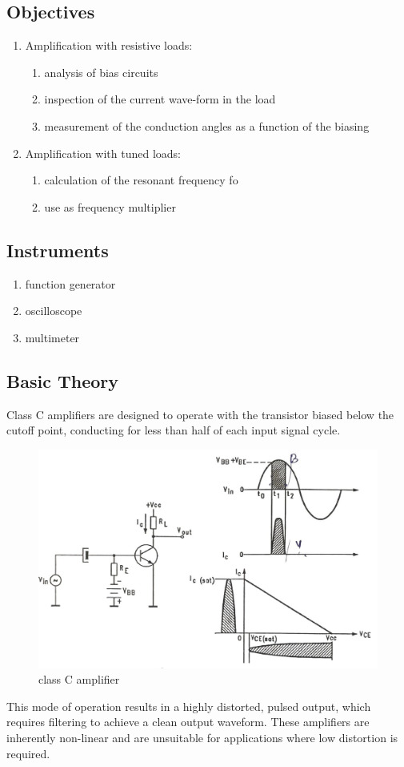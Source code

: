 \documentclass[12pt,a4paper]{article}
\begin{document}
    \subsection{Objectives}
    \begin{enumerate}
        \item Amplification with resistive loads:
        \begin{enumerate}
            \item analysis of bias circuits
            \item inspection of the current wave-form in the load
            \item measurement of the conduction angles as a function of the biasing
        \end{enumerate}
        \item Amplification with tuned loads:
        \begin{enumerate}
            \item calculation of the resonant frequency fo
            \item use as frequency multiplier
        \end{enumerate}
    \end{enumerate}
    \subsection{Instruments}
    \begin{enumerate}
        \item function generator
        \item oscilloscope
        \item multimeter
    \end{enumerate}
    \subsection{Basic Theory}
    Class C amplifiers are designed to operate with the transistor biased below the cutoff point, conducting for less than half of each input signal cycle.
    \begin{figure}[H]
        \centering
        \includegraphics[width=0.5\linewidth]{analogue1_1.jpeg}
        \caption{class C amplifier}
        \label{fig:B32.1}
    \end{figure}
    This mode of operation results in a highly distorted, pulsed output, which requires filtering to achieve a clean output waveform. These amplifiers are inherently non-linear and are unsuitable for applications where low distortion is required.
\end{document}
